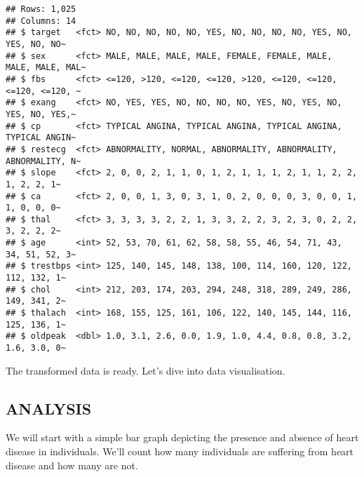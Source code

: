 \documentclass[
]{article}
\newenvironment{Shaded}{\begin{snugshade}}{\end{snugshade}}
\newcommand{\AttributeTok}[1]{\textcolor[rgb]{0.77,0.63,0.00}{#1}}
\newcommand{\FunctionTok}[1]{\textcolor[rgb]{0.00,0.00,0.00}{#1}}
\newcommand{\NormalTok}[1]{#1}
\newcommand{\SpecialCharTok}[1]{\textcolor[rgb]{0.00,0.00,0.00}{#1}}
\newcommand{\StringTok}[1]{\textcolor[rgb]{0.31,0.60,0.02}{#1}}
\begin{document}
\begin{verbatim}
## Rows: 1,025
## Columns: 14
## $ target   <fct> NO, NO, NO, NO, NO, YES, NO, NO, NO, NO, YES, NO, YES, NO, NO~
## $ sex      <fct> MALE, MALE, MALE, MALE, FEMALE, FEMALE, MALE, MALE, MALE, MAL~
## $ fbs      <fct> <=120, >120, <=120, <=120, >120, <=120, <=120, <=120, <=120, ~
## $ exang    <fct> NO, YES, YES, NO, NO, NO, NO, YES, NO, YES, NO, YES, NO, YES,~
## $ cp       <fct> TYPICAL ANGINA, TYPICAL ANGINA, TYPICAL ANGINA, TYPICAL ANGIN~
## $ restecg  <fct> ABNORMALITY, NORMAL, ABNORMALITY, ABNORMALITY, ABNORMALITY, N~
## $ slope    <fct> 2, 0, 0, 2, 1, 1, 0, 1, 2, 1, 1, 1, 2, 1, 1, 2, 2, 1, 2, 2, 1~
## $ ca       <fct> 2, 0, 0, 1, 3, 0, 3, 1, 0, 2, 0, 0, 0, 3, 0, 0, 1, 1, 0, 0, 0~
## $ thal     <fct> 3, 3, 3, 3, 2, 2, 1, 3, 3, 2, 2, 3, 2, 3, 0, 2, 2, 3, 2, 2, 2~
## $ age      <int> 52, 53, 70, 61, 62, 58, 58, 55, 46, 54, 71, 43, 34, 51, 52, 3~
## $ trestbps <int> 125, 140, 145, 148, 138, 100, 114, 160, 120, 122, 112, 132, 1~
## $ chol     <int> 212, 203, 174, 203, 294, 248, 318, 289, 249, 286, 149, 341, 2~
## $ thalach  <int> 168, 155, 125, 161, 106, 122, 140, 145, 144, 116, 125, 136, 1~
## $ oldpeak  <dbl> 1.0, 3.1, 2.6, 0.0, 1.9, 1.0, 4.4, 0.8, 0.8, 3.2, 1.6, 3.0, 0~
\end{verbatim}

The transformed data is ready. Let's dive into data visualisation.

\hypertarget{analysis}{%
\subsection{ANALYSIS}\label{analysis}}

We will start with a simple bar graph depicting the presence and absence
of heart disease in individuals. We'll count how many individuals are
suffering from heart disease and how many are not.

\begin{Shaded}
\end{Shaded}
\end{document}
